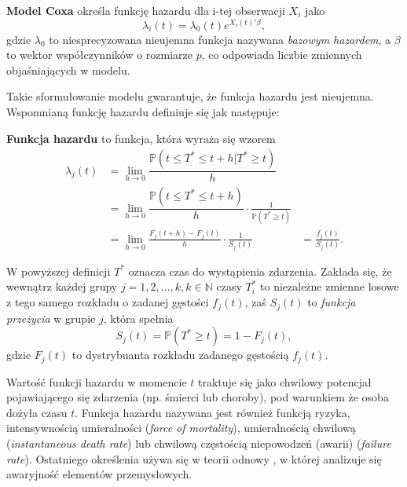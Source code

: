 \begin{definition}
\textbf{Model Coxa} określa funkcję hazardu dla i-tej obserwacji $X_i$ jako
\begin{equation}
\lambda_i(t) = \lambda_0(t)e^{X_i(t)'\beta},
\end{equation}
gdzie $\lambda_0$ to niesprecyzowana nieujemna funkcja nazywana \textit{bazowym hazardem}, a $\beta$ to wektor współczynników o rozmiarze $p$, co odpowiada liczbie zmiennych objaśniających w modelu.
\end{definition}

Takie sformułowanie modelu gwarantuje, że funkcja hazardu jest nieujemna. Wspomnianą funkcję hazardu definiuje się jak następuje:
\begin{definition}
\textbf{Funkcja hazardu} to funkcja, która wyraża się wzorem
\begin{equation}
\begin{align*}
\lambda_j(t) & =  \lim\limits_{h\rightarrow 0}\dfrac{\mathbb{P}(t \leq T^* \leq t +h | T^* \geq t)}{h} & \ \\
 \ & = \lim\limits_{h\rightarrow 0}\dfrac{\mathbb{P}(t \leq T^* \leq t +h )}{h}\cdot\frac{1}{  \mathbb{P}(T^* \geq t)} & \ \\ \ & = \lim\limits_{h\rightarrow 0} \frac{F_j(t+h) - F_j(t) }{h}\cdot\frac{1}{S_j(t)} & =  \frac{f_j(t)}{S_j(t)}.
\end{align*}
\end{equation}
\end{definition}

W powyższej definicji $T^*$ oznacza czas do wystąpienia zdarzenia. Zakłada się, że wewnątrz każdej grupy $j=1,2,\dots, k, k \in \mathbb{N}$ czasy $T_i^*$ to niezależne zmienne losowe z tego samego rozkładu o zadanej gęstości $f_j(t)$, zaś $S_j(t)$ to \textit{funkcja przeżycia} w grupie $j$, która spełnia 
\begin{equation}
S_j(t) = \mathbb{P}(T^* \geq t )  = 1 - F_j(t), 
\end{equation}
gdzie $F_j(t)$ to dystrybuanta rozkładu zadanego gęstością $f_j(t)$.


Wartość funkcji hazardu w momencie $t$ traktuje się jako chwilowy potencjał pojawiającego się zdarzenia (np. śmierci lub choroby), pod warunkiem że osoba dożyła czasu $t$. Funkcja hazardu nazywana jest również funkcją ryzyka,
intensywnością umieralności (\textit{force of mortality}), umieralnością
chwilową (\textit{instantaneous death rate}) lub chwilową
częstością niepowodzeń (awarii) (\textit{failure rate}). Ostatniego
określenia używa się w teorii odnowy \cite{cox0}, w której analizuje
się awaryjność elementów przemysłowych. 


